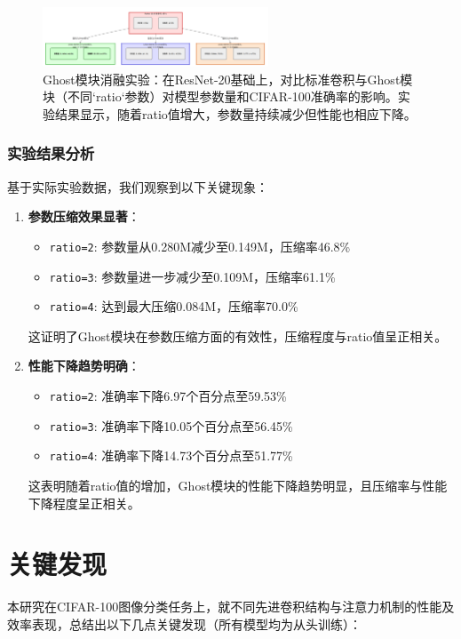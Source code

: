 \documentclass[a4paper]{article}
\begin{document}
\begin{description}
\begin{figure}[H]
    \centering
    \includegraphics[width=0.6\textwidth]{1.png}
    \caption{Ghost模块消融实验：在ResNet-20基础上，对比标准卷积与Ghost模块（不同`ratio`参数）对模型参数量和CIFAR-100准确率的影响。实验结果显示，随着ratio值增大，参数量持续减少但性能也相应下降。}
    \label{fig:ghost_ablation_chart}
\end{figure}

\subsubsection{实验结果分析}
基于实际实验数据，我们观察到以下关键现象：
\begin{enumerate}
    \item \textbf{参数压缩效果显著}：
    \begin{itemize}
        \item \texttt{ratio=2}: 参数量从0.280M减少至0.149M，压缩率46.8\%
        \item \texttt{ratio=3}: 参数量进一步减少至0.109M，压缩率61.1\%
        \item \texttt{ratio=4}: 达到最大压缩0.084M，压缩率70.0\%
    \end{itemize}
    这证明了Ghost模块在参数压缩方面的有效性，压缩程度与ratio值呈正相关。
    \item \textbf{性能下降趋势明确}：
    \begin{itemize}
        \item \texttt{ratio=2}: 准确率下降6.97个百分点至59.53\%
        \item \texttt{ratio=3}: 准确率下降10.05个百分点至56.45\%
        \item \texttt{ratio=4}: 准确率下降14.73个百分点至51.77\%
    \end{itemize}
    这表明随着ratio值的增加，Ghost模块的性能下降趋势明显，且压缩率与性能下降程度呈正相关。
\end{enumerate}

\section{关键发现}
本研究在CIFAR-100图像分类任务上，就不同先进卷积结构与注意力机制的性能及效率表现，总结出以下几点关键发现（所有模型均为从头训练）：


\end{description}
\end{document}
